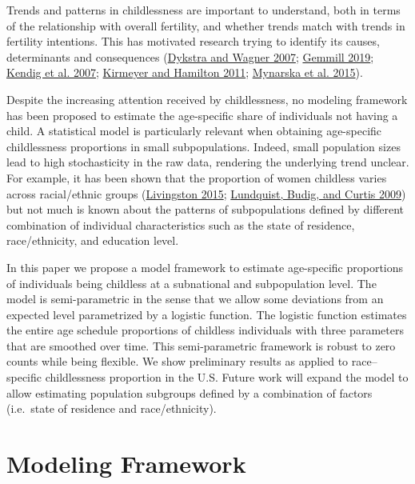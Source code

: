 \documentclass[
  11pt,
  letterpaper,
]{article}
\begin{document}
Trends and patterns in childlessness are important to understand, both in terms of the relationship with overall fertility, and whether trends match with trends in fertility intentions. This has motivated research trying to identify its causes, determinants and consequences (\protect\hyperlink{ref-dykstra2007pathways}{Dykstra and Wagner 2007}; \protect\hyperlink{ref-gemmill2019some}{Gemmill 2019}; \protect\hyperlink{ref-kendig2007health}{Kendig et al. 2007}; \protect\hyperlink{ref-kirmeyer2011childbearing}{Kirmeyer and Hamilton 2011}; \protect\hyperlink{ref-mynarska2015diverse}{Mynarska et al. 2015}).

Despite the increasing attention received by childlessness, no modeling framework has been proposed to estimate the age-specific share of individuals not having a child. A statistical model is particularly relevant when
obtaining age-specific childlessness proportions in small subpopulations. Indeed, small population sizes lead to high stochasticity in the raw data, rendering the underlying trend unclear. For example, it has been shown that the proportion of women childless varies across racial/ethnic groups (\protect\hyperlink{ref-livingston2015childlessness}{Livingston 2015}; \protect\hyperlink{ref-lundquist2009race}{Lundquist, Budig, and Curtis 2009}) but not much is known about the patterns of subpopulations defined by different combination of individual characteristics such as the state of residence, race/ethnicity, and education level.

In this paper we propose a model framework to estimate age-specific proportions of individuals being childless at a subnational and subpopulation level. The model is semi-parametric in the sense that we allow some deviations from an expected level parametrized by a logistic function. The logistic function estimates the entire age schedule proportions of childless individuals with three parameters that are smoothed over time. This semi-parametric framework is robust to zero counts while being flexible. We show preliminary results as applied to race--specific childlessness proportion in the U.S. Future work will expand the model to allow estimating population subgroups defined by a combination of factors (i.e.~state of residence and race/ethnicity).

\hypertarget{modeling-framework}{%
\section{Modeling Framework}\label{modeling-framework}}
\end{document}
